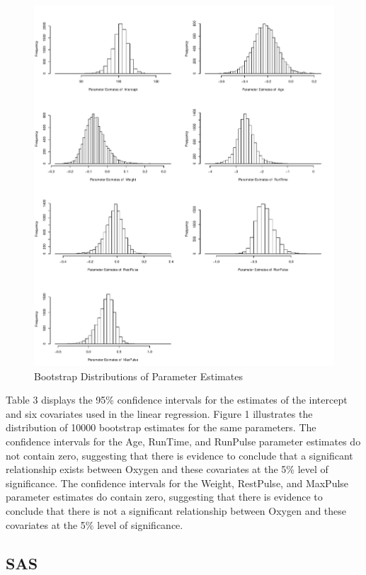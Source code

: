\documentclass[]{article}
\begin{document}
\begin{figure}
\centering
\includegraphics{Report_files/figure-latex/rcode-1.pdf}
\caption{\label{fig:rcode} Bootstrap Distributions of Parameter
Estimates}
\end{figure}

Table 3 displays the 95\% confidence intervals for the estimates of the
intercept and six covariates used in the linear regression. Figure 1
illustrates the distribution of 10000 bootstrap estimates for the same
parameters. The confidence intervals for the Age, RunTime, and RunPulse
parameter estimates do not contain zero, suggesting that there is
evidence to conclude that a significant relationship exists between
Oxygen and these covariates at the 5\% level of significance. The
confidence intervals for the Weight, RestPulse, and MaxPulse parameter
estimates do contain zero, suggesting that there is evidence to conclude
that there is not a significant relationship between Oxygen and these
covariates at the 5\% level of significance.

\pagebreak 

\subsection{SAS}\label{sas}
\end{document}
